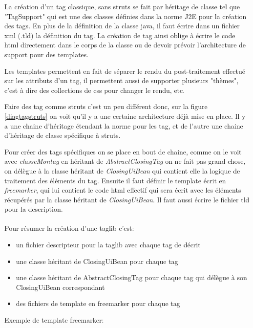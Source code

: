 La création d'un tag classique, sans struts se fait par héritage de classe 
tel que "TagSupport" qui est une des classes définies dans la norme J2E pour la 
création des tags. En plus de la définition de la classe java, il faut écrire
dans un fichier xml (.tld) la définition du tag. La création de tag ainsi oblige
à écrire le code html directement dans le corps de la classe ou de devoir prévoir
l'architecture de support pour des templates.

Les templates permettent en fait de séparer le rendu du post-traitement effectué
sur les attributs d'un tag, il permettent aussi de supporter plusieurs "thèmes", 
c'est à dire des collections de css pour changer le rendu, etc.

Faire des tag comme struts c'est un peu différent donc, sur la figure \ref{diagtagstruts} 
on voit qu'il y a une certaine architecture déjà mise en place. Il y a une chaine 
d'héritage étendant la norme pour les tag, et de l'autre une chaine d'héritage 
de classe spécifique à struts. 

Pour créer des tags spécifiques on se place en bout de chaine, comme on le voit 
avec \emph{classeMontag} en héritant de \emph{AbstractClosingTag} on ne fait pas
grand chose, on délègue à la classe héritant de \emph{ClosingUiBean} qui contient 
elle la logique de traitement des éléments du tag. Ensuite il faut définir le
template écrit en \emph{freemarker}, qui lui contient le code html effectif 
qui sera écrit avec les éléments récupérés par la classe héritant de \emph{ClosingUiBean}.
Il faut aussi écrire le fichier tld pour la description.\\
\\
Pour résumer la création d'une taglib c'est:

\begin{itemize}
\item un fichier descripteur pour la taglib avec chaque tag de décrit 
\item une classe héritant de ClosingUiBean pour chaque tag
\item une classe héritant de AbstractClosingTag pour chaque tag qui délègue à son ClosingUiBean correspondant
\item des fichiers de template en freemarker pour chaque tag
\end{itemize}

Exemple de template freemarker:

